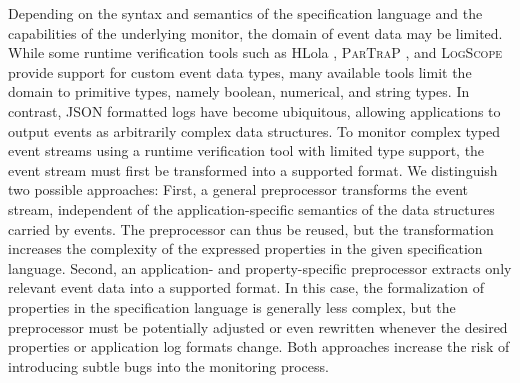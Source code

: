 Depending on the syntax and semantics of the specification language and the capabilities of the underlying monitor, the domain of event data may be limited. While some runtime verification tools such as HLola \cite{gorostiagaHLolaVeryFunctional2021}, \textsc{ParTraP} \cite{bleinExtendingSpecificationPatterns2018}, and \textsc{LogScope} \cite{barringerFormalAnalysisLog2010} provide support for custom event data types, many available tools limit the domain to primitive types, namely boolean, numerical, and string types. In contrast, JSON formatted logs have become ubiquitous, allowing applications to output events as arbitrarily complex data structures. To monitor complex typed event streams using a runtime verification tool with limited type support, the event stream must first be transformed into a supported format. We distinguish two possible approaches: First, a general preprocessor transforms the event stream, independent of the application-specific semantics of the data structures carried by events. The preprocessor can thus be reused, but the transformation increases the complexity of the expressed properties in the given specification language. Second, an application- and property-specific preprocessor extracts only relevant event data into a supported format. In this case, the formalization of properties in the specification language is generally less complex, but the preprocessor must be potentially adjusted or even rewritten whenever the desired properties or application log formats change. Both approaches increase the risk of introducing subtle bugs into the monitoring process.

